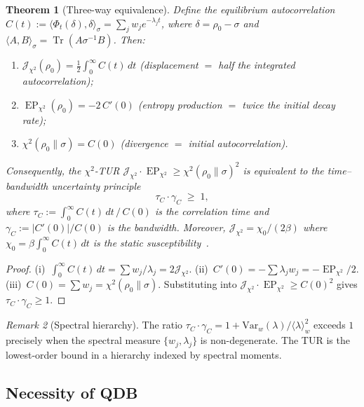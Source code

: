 \documentclass[11pt,a4paper]{article}
\newtheorem{theorem}{Theorem}[section]
\theoremstyle{definition}
\theoremstyle{remark}
\newtheorem{remark}[theorem]{Remark}
\DeclareMathOperator{\Tr}{Tr}
\DeclareMathOperator{\EP}{EP}
\newcommand{\inner}[2]{\langle #1, #2 \rangle}
\newcommand{\Jchi}{\mathcal{J}_{\chi^2}}
\newcommand{\EPchi}{\EP_{\chi^2}}
\begin{document}
\begin{theorem}[Three-way equivalence]\label{thm:FDT}
Define the equilibrium autocorrelation
$C(t) := \inner{\Phi_t(\delta)}{\delta}_\sigma
= \sum_j w_j e^{-\lambda_j t}$,
where $\delta = \rho_0 - \sigma$ and
$\inner{A}{B}_\sigma = \Tr(A\sigma^{-1}B)$.  Then:
\begin{enumerate}[label=\textup{(\roman*)}]
  \item $\Jchi(\rho_0) = \frac{1}{2}\int_0^\infty C(t)\,dt$
  \quad\textup{(displacement $=$ half the integrated autocorrelation);}
  \item $\EPchi(\rho_0) = -2\,C'(0)$
  \quad\textup{(entropy production $=$ twice the initial decay rate);}
  \item $\chi^2(\rho_0\|\sigma) = C(0)$
  \quad\textup{(divergence $=$ initial autocorrelation).}
\end{enumerate}
Consequently, the $\chi^2$-TUR
$\Jchi\cdot\EPchi \ge \chi^2(\rho_0\|\sigma)^2$ is equivalent to
the time--bandwidth uncertainty principle
\begin{equation}\label{eq:time-bandwidth}
  \tau_C \cdot \gamma_C \;\ge\; 1,
\end{equation}
where $\tau_C := \int_0^\infty C(t)\,dt\,/\,C(0)$ is the
correlation time and $\gamma_C := |C'(0)|/C(0)$ is the bandwidth.
Moreover, $\Jchi = \chi_0/(2\beta)$ where
$\chi_0 = \beta\int_0^\infty C(t)\,dt$ is the static
susceptibility~\cite{Kubo1966}.
\end{theorem}

\begin{proof}
(i)~$\int_0^\infty C(t)\,dt = \sum w_j/\lambda_j = 2\Jchi$.
(ii)~$C'(0) = -\sum\lambda_j w_j = -\EPchi/2$.
(iii)~$C(0) = \sum w_j = \chi^2(\rho_0\|\sigma)$.
Substituting into $\Jchi\cdot\EPchi \ge C(0)^2$ gives
$\tau_C\cdot\gamma_C \ge 1$.
\end{proof}

\begin{remark}[Spectral hierarchy]\label{rem:hierarchy}
The ratio $\tau_C\cdot\gamma_C
= 1 + \mathrm{Var}_w(\lambda)/\langle\lambda\rangle_w^2$
exceeds $1$ precisely when the spectral measure
$\{w_j,\lambda_j\}$ is non-degenerate.
The TUR is the lowest-order bound in a hierarchy indexed by
spectral moments.
\end{remark}

\subsection{Necessity of QDB}\label{ssec:necessity}
\end{document}

